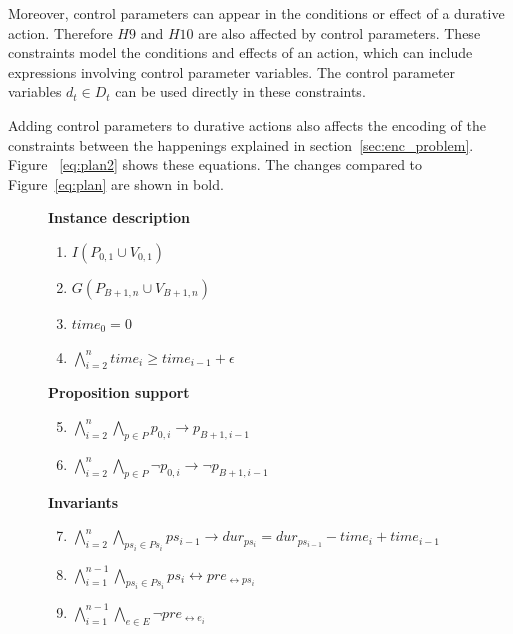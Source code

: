 Moreover, control parameters can appear in the conditions or effect of a durative action. Therefore $H9$ and $H10$ are also affected by control parameters. These constraints model the conditions and effects of an action, which can include expressions involving control parameter variables. The control parameter variables $d_t\in D_t$ can be used directly in these constraints.

Adding control parameters to durative actions also affects the encoding of the constraints between the happenings explained in section~\ref{sec:enc_problem}. Figure ~\ref{eq:plan2} shows these equations. The changes compared to Figure~\ref{eq:plan} are shown in bold.

\begin{figure}[thb!]
\begin{minipage}[t]{0.39\linewidth}
\textbf{Instance description}
\begin{enumerate}[label=P\arabic*.]
 \item $I(P_{0,1}\cup V_{0,1})$
 \item $G(P_{B+1,n}\cup V_{B+1,n})$
 \item $time_0 = 0$
 \item $\bigwedge_{i=2}^n time_i \geq time_{i-1}+\epsilon$
\end{enumerate}
\textbf{Proposition support}
\begin{enumerate}[label=P\arabic*.]\setcounter{enumi}{4}
 \item $\bigwedge_{i=2}^n \bigwedge_{p\in P} p_{0,i} \rightarrow p_{B+1,i-1}$
 \item $\bigwedge_{i=2}^n \bigwedge_{p\in P} \neg p_{0,i} \rightarrow \neg p_{B+1,i-1}$
\end{enumerate}
\end{minipage}
\begin{minipage}[t]{0.6\linewidth}
\textbf{Invariants}
\begin{enumerate}[label=P\arabic*.]\setcounter{enumi}{6}
 \item $\bigwedge_{i=2}^n \bigwedge_{ps_i\in Ps_i} ps_{i-1} \rightarrow dur_{ps_i} = dur_{ps_{i-1}} - time_i + time_{i-1}$
 \item $\bigwedge_{i=1}^{n-1} \bigwedge_{ps_i\in Ps_i}  ps_i \leftrightarrow pre_{\leftrightarrow ps_i}$
 \item $\bigwedge_{i=1}^{n-1} \bigwedge_{e\in E} \neg pre_{\leftrightarrow e_i}$

\end{enumerate}
\end{minipage}
\end{figure}
